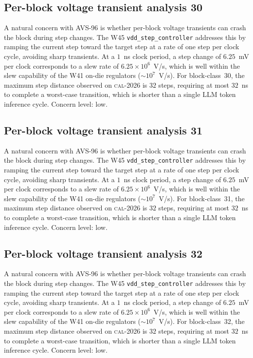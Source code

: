 \subsection{Per-block voltage transient analysis 30}

A natural concern with AVS-96 is whether per-block voltage transients
can crash the block during step changes. The W45 \texttt{vdd\_step\_controller} addresses this by ramping the current
step toward the target step at a rate of one step per clock cycle,
avoiding sharp transients. At a $1$~ns clock period, a step change of
$6.25$~mV per clock corresponds to a slew rate of $6.25\times 10^6$~V/s,
which is well within the slew capability of the W41 on-die regulators
($\sim 10^7$~V/s). For block-class~30, the maximum step distance
observed on \textsc{cal-2026} is $32$ steps, requiring at most $32$~ns
to complete a worst-case transition, which is shorter than a single
LLM token inference cycle. Concern level: low.


\subsection{Per-block voltage transient analysis 31}

A natural concern with AVS-96 is whether per-block voltage transients
can crash the block during step changes. The W45 \texttt{vdd\_step\_controller} addresses this by ramping the current
step toward the target step at a rate of one step per clock cycle,
avoiding sharp transients. At a $1$~ns clock period, a step change of
$6.25$~mV per clock corresponds to a slew rate of $6.25\times 10^6$~V/s,
which is well within the slew capability of the W41 on-die regulators
($\sim 10^7$~V/s). For block-class~31, the maximum step distance
observed on \textsc{cal-2026} is $32$ steps, requiring at most $32$~ns
to complete a worst-case transition, which is shorter than a single
LLM token inference cycle. Concern level: low.


\subsection{Per-block voltage transient analysis 32}

A natural concern with AVS-96 is whether per-block voltage transients
can crash the block during step changes. The W45 \texttt{vdd\_step\_controller} addresses this by ramping the current
step toward the target step at a rate of one step per clock cycle,
avoiding sharp transients. At a $1$~ns clock period, a step change of
$6.25$~mV per clock corresponds to a slew rate of $6.25\times 10^6$~V/s,
which is well within the slew capability of the W41 on-die regulators
($\sim 10^7$~V/s). For block-class~32, the maximum step distance
observed on \textsc{cal-2026} is $32$ steps, requiring at most $32$~ns
to complete a worst-case transition, which is shorter than a single
LLM token inference cycle. Concern level: low.


